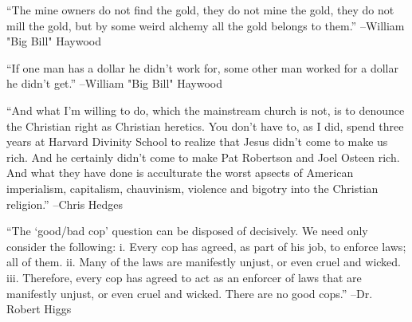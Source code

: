 \documentclass{article}%
\begin{document}
\linebreak%
\vspace{1mm}%
\begin{minipage}{\textwidth}%
\flushleft%
“The mine owners do not find the gold, they do not mine the gold, they do not mill the gold, but by some weird alchemy all the gold belongs to them.”%
\linebreak%
\vspace{1mm}%
–William "Big Bill" Haywood%
\linebreak%
\vspace{1mm}%
\end{minipage}%
\linebreak%
\vspace{1mm}%
\begin{minipage}{\textwidth}%
\flushleft%
“If one man has a dollar he didn't work for, some other man worked for a dollar he didn't get.”%
\linebreak%
\vspace{1mm}%
–William "Big Bill" Haywood%
\linebreak%
\vspace{1mm}%
\end{minipage}%
\linebreak%
\vspace{1mm}%
\begin{minipage}{\textwidth}%
\flushleft%
“And what I'm willing to do, which the mainstream church is not, is to denounce the Christian right as Christian heretics. You don't have to, as I did, spend three years at Harvard Divinity School to realize that Jesus didn't come to make us rich. And he certainly didn't come to make Pat Robertson and Joel Osteen rich. And what they have done is acculturate the worst apsects of American imperialism, capitalism, chauvinism, violence and bigotry into the Christian religion.”%
\linebreak%
\vspace{1mm}%
–Chris Hedges%
\linebreak%
\vspace{1mm}%
\end{minipage}%
\linebreak%
\vspace{1mm}%
\begin{minipage}{\textwidth}%
\flushleft%
“The ‘good/bad cop’ question can be disposed of decisively. We need only consider the  following:  i. Every cop has agreed, as part of his job, to enforce laws; all of them.  ii. Many of the laws are manifestly unjust, or even cruel and wicked.  iii. Therefore, every cop has agreed to act as an enforcer of laws that are manifestly unjust, or even cruel and wicked.  There are no good cops.”%
\linebreak%
\vspace{1mm}%
–Dr. Robert Higgs%
\linebreak%
\vspace{1mm}%
\end{minipage}%
\end{document}
